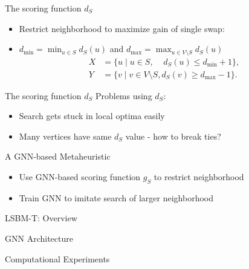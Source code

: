 \documentclass{beamer}
\begin{document}
\begin{frame}{The scoring function $d_S$}
    \begin{itemize}
        \item Restrict neighborhood to maximize gain of single swap:
        \item $d_{\min} = \min_{u \in S} d_S(u)$ and $d_{\max} = \max_{u \in V \setminus S} d_S(u)$
        \begin{align*}
            X &= \{ u \mid u \in S,~~~~~ d_S(u) \leq d_{\min} + 1 \}, \\
            Y &= \{ v \mid v \in V \setminus S, d_S(v) \geq d_{\max} - 1 \}.
        \end{align*}
    \end{itemize}
\end{frame}


\begin{frame}{The scoring function $d_S$}
    Problems using $d_S$:
    \begin{itemize}
        \item<1-> Search gets stuck in local optima easily
        \item<2-> Many vertices have same $d_S$ value - how to break ties?
    \end{itemize}
\end{frame}

\begin{frame}{A GNN-based Metaheuristic}
    \begin{itemize}
        \item Use GNN-based scoring function $g_S$ to restrict neighborhood
        \item Train GNN to imitate search of larger neighborhood
    \end{itemize}
\end{frame}

\begin{frame}{LSBM-T: Overview}

\end{frame}

\begin{frame}{GNN Architecture}

\end{frame}

\begin{frame}{Computational Experiments}

\end{frame}
\end{document}
